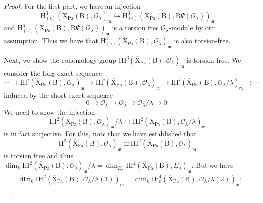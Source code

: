 \documentclass[10pt]{amsart}
\numberwithin{equation}{section}
\theoremstyle{definition}
\def\Pa{\mathrm{Pa}}
\def\IH{\mathrm{IH}}
\def\calO{\mathcal{O}}
\def\fracm{\mathfrak{m}}
\def\rmc{\mathrm{c}}
\def\rmB{\mathrm{B}}
\def\rmH{\mathrm{H}}
\def\rmR{\mathrm{R}}
\def\rmX{\mathrm{X}}
\begin{document}
\begin{proof}
For the first part,  we have an injection 
\begin{equation*}
\rmH^{3}_{(\rmc)}(\overline{\rmX}_{\Pa}(\rmB), \calO_{\lambda})_{\fracm}\hookrightarrow \rmH^{3}_{(\rmc)}(\overline{\rmX}_{\Pa}(\rmB), \rmR\Psi(\calO_{\lambda}))_{\fracm}
\end{equation*}
and $\rmH^{3}_{(\rmc)}(\overline{\rmX}_{\Pa}(\rmB), \rmR\Psi(\calO_{\lambda}))_{\fracm}$ is a torsion free $\calO_{\lambda}$-module by our assumption. Thus we have that $\rmH^{3}_{(\rmc)}(\overline{\rmX}_{\Pa}(\rmB), \calO_{\lambda})_{\fracm}$ is also torsion-free. 

Next, we show the cohomology group $\mathrm{IH}^{3}(\overline{\rmX}_{\Pa}(\rmB), \calO_{\lambda})_{\fracm}$ is torsion free. We consider the long exact sequence 
\begin{equation*}
\cdots\rightarrow \mathrm{IH}^{i}(\overline{\rmX}_{\Pa}(\rmB), \calO_{\lambda})_{\fracm}\rightarrow \mathrm{IH}^{i}(\overline{\rmX}_{\Pa}(\rmB), \calO_{\lambda})_{\fracm}\rightarrow \mathrm{IH}^{i}(\overline{\rmX}_{\Pa}(\rmB), \calO_{\lambda}/\lambda)_{\fracm}\rightarrow\cdots
\end{equation*}
induced by the short exact sequence 
\begin{equation*}
0\rightarrow \calO_{\lambda}\rightarrow\calO_{\lambda}\rightarrow \calO_{\lambda}/\lambda\rightarrow0.
\end{equation*}
We need to show the injection 
\begin{equation*}
\IH^{2}(\overline{\rmX}_{\Pa}(\rmB), \calO_{\lambda})_{\fracm}/\lambda\hookrightarrow \IH^{2}(\overline{\rmX}_{\Pa}(\rmB), \calO_{\lambda}/\lambda)_{\fracm}
\end{equation*}
is in fact surjective. For this, note that we have established that 
\begin{equation*}
\rmH^{2}(\overline{\rmX}^{\square}_{\Pa}(\rmB), \calO_{\lambda})_{\fracm}\cong\IH^{2}(\overline{\rmX}_{\Pa}(\rmB), \calO_{\lambda})_{\fracm} 
\end{equation*}
is torsion free and thus $\dim_{k} \IH^{2}(\overline{\rmX}_{\Pa}(\rmB), \calO_{\lambda})_{\fracm}/\lambda=\dim_{E_{\lambda}} \IH^{2}(\overline{\rmX}_{\Pa}(\rmB), E_{\lambda})_{\fracm}$. But we have 
\begin{equation*}
\begin{aligned}
&\dim_{k} \IH^{2}(\overline{\rmX}_{\Pa}(\rmB), \calO_{\lambda}/\lambda(1))_{\fracm}=\dim_{k} \IH^{4}_{\rmc}(\overline{\rmX}_{\Pa}(\rmB), \calO_{\lambda}/\lambda(2))_{\fracm};\\

\end{aligned}
\end{equation*}
\end{proof}
\end{document}
